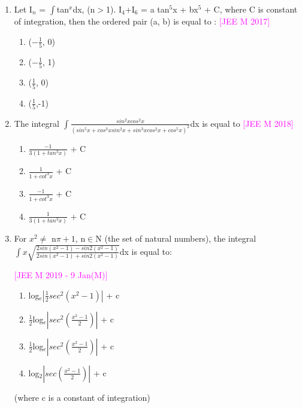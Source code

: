 \documentclass[journal,12pt,twocolumn]{IEEEtran}
\theoremstyle{remark}
\begin{document}
\begin{enumerate}[label=\textcolor{magenta}{\arabic*.}]
	\item Let I$_n$ = $\int$tan$^x$dx, (n$>$1). I$_4$+I$_6$ = a tan$^5$x + bx$^5$ + C, where C is constant of integration, then the ordered pair (a, b) is equal to :
		\hfill{\textcolor{magenta}{[JEE M 2017]}}

		\begin{multicols}{4}
			\begin{enumerate}[label=(\alph*)]
				\item ($-\frac{1}{5}$, 0)
				\item ($-\frac{1}{5}$, 1)
				\item ($\frac{1}{5}$, 0)
				\item ($\frac{1}{5}$,-1)
			\end{enumerate}
		\end{multicols}
		
	\item The integral $\int\frac{sin^2xcos^2x}{(sin^5x+cos^3xsin^2x+sin^3xcos^2x+cos^5x)^2}$dx is equal to
		\hfill{\textcolor{magenta}{[JEE M 2018]}}
		
		\begin{multicols}{2}
			\begin{enumerate}[label=(\alph*)]
				\item $\frac{-1}{3(1+tan^3x)}$ + C
				\item $\frac{1}{1+cot^3x}$ + C
				\item $\frac{-1}{1+cot^3x}$ + C
				\item $\frac{1}{3(1+tan^3x)}$ + C
			\end{enumerate}
		\end{multicols}
		
	\item For $x^2\neq$ n$\pi+1$, n$\in$N (the set of natural numbers), the integral $\int x\sqrt{\frac{2sin(x^2-1)-sin2(x^2-1)}{2sin(x^2-1)+sin2(x^2-1)}}$dx is equal to:

		\hfill{\textcolor{magenta}{[JEE M 2019 - 9 Jan(M)]}}

		\begin{multicols}{1}
			\begin{enumerate}[label=(\alph*)]
				\item log$_e|\frac{1}{2}sec^2(x^2-1)|$ + c
				\item $\frac{1}{2}$log$_e|sec^2(\frac{x^2-1}{2})|$ + c
				\item $\frac{1}{2}$log$_e|sec^2(\frac{x^2-1}{2})|$ + c
				\item log$_2|sec(\frac{x^2-1}{2})|$ + c
			\end{enumerate}
		\end{multicols}
		(where c is a constant of integration)


\end{enumerate}
\end{document}

